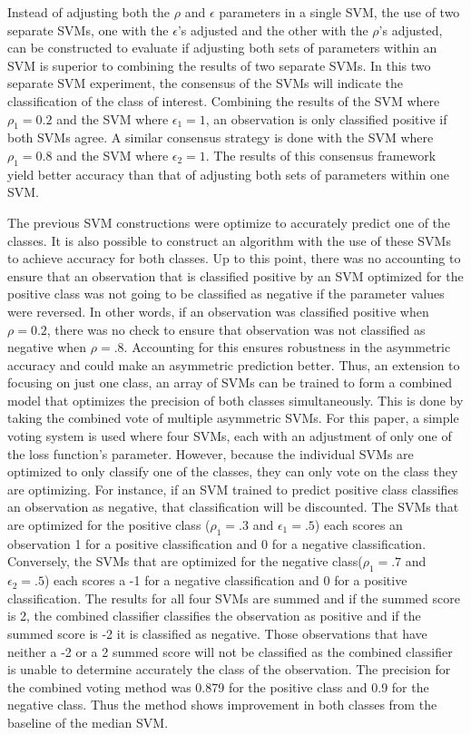 Instead of adjusting both the $\rho$ and $\epsilon$ parameters in a single SVM, the use of two separate SVMs, one with the $\epsilon$'s adjusted and the other with the $\rho$'s adjusted, can be constructed to evaluate if adjusting both sets of parameters within an SVM is superior to combining the results of two separate SVMs. In this two separate SVM experiment, the consensus of the SVMs will indicate the classification of the class of interest. Combining the results of the SVM where $\rho_1=0.2$ and the SVM where $\epsilon_1=1$, an observation is only classified positive if both SVMs agree. A similar consensus strategy is done with the SVM where $\rho_1=0.8$ and the SVM where $\epsilon_2=1$. The results of this consensus framework yield better accuracy than that of adjusting both sets of parameters within one SVM. 

The previous SVM constructions were optimize to accurately predict one of the classes. It is also possible to construct an algorithm with the use of these SVMs to achieve accuracy for both classes. Up to this point, there was no accounting to ensure that an observation that is classified positive by an SVM optimized for the positive class was not going to be classified as negative if the parameter values were reversed. In other words, if an observation was classified positive when $\rho=0.2$, there was no check to ensure that observation was not classified as negative when $\rho=.8$. Accounting for this ensures robustness in the asymmetric accuracy and could make an asymmetric prediction better. Thus, an extension to focusing on just one class, an array of SVMs can be trained to form a combined model that optimizes the precision of both classes simultaneously. This is done by taking the combined vote of multiple asymmetric SVMs. For this paper, a simple voting system is used where four SVMs, each with an adjustment of only one of the loss function's parameter. However, because the individual SVMs are optimized to only classify one of the classes, they can only vote on the class they are optimizing. For instance, if an SVM trained to predict positive class classifies an observation as negative, that classification will be discounted. The SVMs that are optimized for the positive class ($\rho_1=.3$ and $\epsilon_1=.5$) each scores an observation 1 for a positive classification and 0 for a negative classification. Conversely, the SVMs that are optimized for the negative class($\rho_1=.7$ and $\epsilon_2=.5$) each scores a -1 for a negative classification and 0 for a positive classification. The results for all four SVMs are summed and if the summed score is 2, the combined classifier classifies the observation as positive and if the summed score is -2 it is classified as negative. Those observations that have neither a -2 or a 2 summed score will not be classified as the combined classifier is unable to determine accurately the class of the observation. The precision for the combined voting method was 0.879 for the positive class and 0.9 for the negative class. Thus the method shows improvement in both classes from the baseline of the median SVM.

